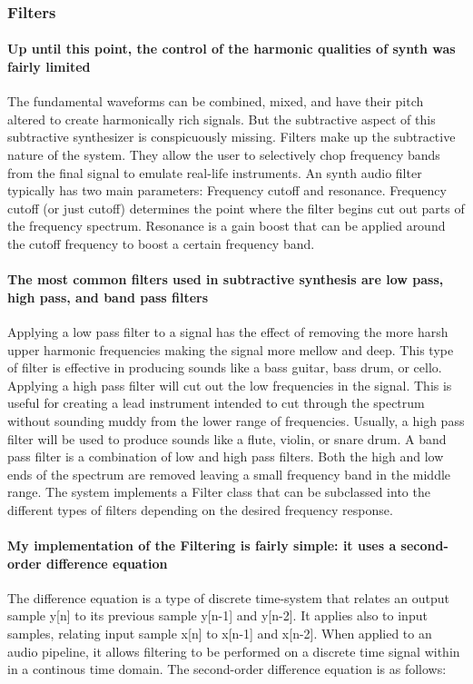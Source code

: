 \documentclass[acmlarge,screen]{acmart}
\begin{document}
	\subsubsection{Filters}
	\paragraph{Up until this point, the control of the harmonic qualities of synth was fairly limited} The fundamental waveforms can be combined, mixed, and have their pitch altered to create harmonically rich signals. But the subtractive aspect of this subtractive synthesizer is conspicuously missing. Filters make up the subtractive nature of the system. They allow the user to selectively chop frequency bands from the final signal to emulate real-life instruments.\cite{welsh_2006} An synth audio filter typically has two main parameters: Frequency cutoff and resonance. Frequency cutoff (or just cutoff) determines the point where the filter begins cut out parts of the frequency spectrum. Resonance is a gain boost that can be applied around the cutoff frequency to boost a certain frequency band. \cite{musictech}
	
	\paragraph{The most common filters used in subtractive synthesis are low pass, high pass, and band pass filters} Applying a low pass filter to a signal has the effect of removing the more harsh upper harmonic frequencies making the signal more mellow and deep. This type of filter is effective in producing sounds like a bass guitar, bass drum, or cello. Applying a high pass filter will cut out the low frequencies in the signal. This is useful for creating a lead instrument intended to cut through the spectrum without sounding muddy from the lower range of frequencies. Usually, a high pass filter will be used to produce sounds like a flute, violin, or snare drum. A band pass filter is a combination of low and high pass filters. Both the high and low ends of the spectrum are removed leaving a small frequency band in the middle range. The system implements a Filter class that can be subclassed into the different types of filters depending on the desired frequency response. \cite{hass_2021} 
	
	\paragraph{My implementation of the Filtering is fairly simple: it uses a second-order difference equation} The difference equation is a type of discrete time-system that relates an output sample y[n] to its previous sample y[n-1] and y[n-2]. It applies also to input samples, relating input sample x[n] to x[n-1] and x[n-2]. When applied to an audio pipeline, it allows filtering to be performed on a discrete time signal within in a continous time domain.\cite{stanford_2007} The second-order difference equation is as follows: 
	
\end{document}
